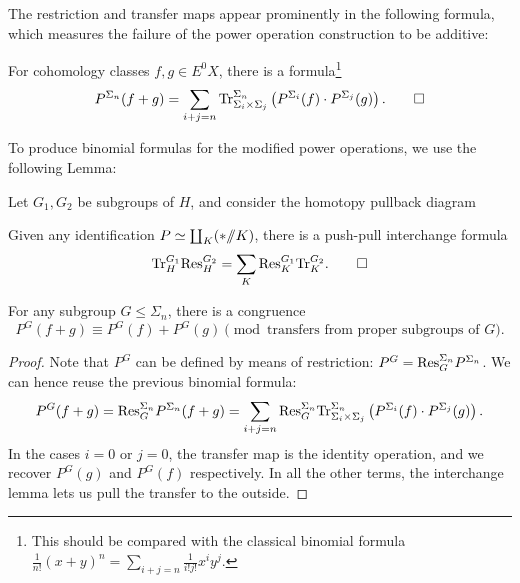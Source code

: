 The restriction and transfer maps appear prominently in the following formula, which measures the failure of the power operation construction to be additive:
\begin{lemma}
For cohomology classes $f, g \in E^0 X$, there is a formula\footnote{This should be compared with the classical binomial formula $\frac{1}{n!} (x + y)^n = \sum_{i+j = n} \frac{1}{i!j!} x^i y^j$.} \[P^{\Sigma_n}(f + g) = \sum_{i + j = n} \mathrm{Tr}_{\Sigma_i \times \Sigma_j}^{\Sigma_n}\left(P^{\Sigma_i}(f) \cdot P^{\Sigma_j}(g)\right). \qed\]
\end{lemma}

\noindent To produce binomial formulas for the modified power operations, we use the following Lemma:

\begin{lemma}
Let $G_1, G_2$ be subgroups of $H$, and consider the homotopy pullback diagram
\begin{center}
\end{center}
Given any identification $P \simeq \coprod_K (* /\!\!/ K)$, there is a push-pull interchange formula \[\mathrm{Tr}^{G_1}_H \mathrm{Res}_H^{G_2} = \sum_K \mathrm{Res}^{G_1}_K \mathrm{Tr}_K^{G_2}. \qed\]
\end{lemma}

\begin{corollary}
For any subgroup $G \le \Sigma_n$, there is a congruence \[P^G(f + g) \equiv P^G(f) + P^G(g) \pmod{\text{transfers from proper subgroups of $G$}}.\]
\end{corollary}
\begin{proof}
Note that $P^G$ can be defined by means of restriction: $P^G = \mathrm{Res}^{\Sigma_n}_G P^{\Sigma_n}$.  We can hence reuse the previous binomial formula: \[P^G(f + g) = \mathrm{Res}^{\Sigma_n}_G P^{\Sigma_n}(f + g) = \sum_{i+j = n} \mathrm{Res}^{\Sigma_n}_G \mathrm{Tr}_{\Sigma_i \times \Sigma_j}^{\Sigma_n}\left(P^{\Sigma_i}(f) \cdot P^{\Sigma_j}(g)\right).\]  In the cases $i = 0$ or $j = 0$, the transfer map is the identity operation, and we recover $P^G(g)$ and $P^G(f)$ respectively.  In all the other terms, the interchange lemma lets us pull the transfer to the outside.
\end{proof}


